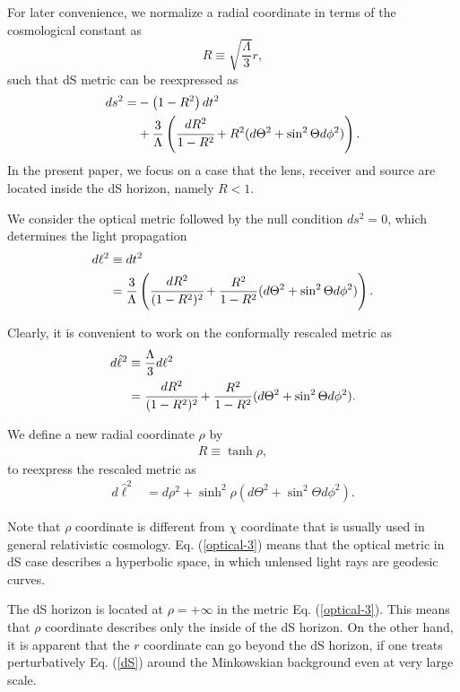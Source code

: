 \documentclass[twocolumn,showpacs,preprintnumbers,amsmath,amssymb]{revtex4-1}
\begin{document}
For later convenience, we normalize a radial coordinate 
in terms of the cosmological constant as 
\begin{equation}
R \equiv \sqrt{\frac{\Lambda}{3}} r , 
\label{R} 
\end{equation}
such that dS metric can be reexpressed as 
\begin{align}
  d s^2 =& -\left(1 - R^2\right) d t^2 
  \nonumber\\
  &+ 
 \frac{3}{\Lambda} 
 \left(
 \cfrac{d R^2}{1 - R^2}
+ R^2( d\Theta^2 + \sin^2 \Theta d\phi^2) 
\right) .
\label{dS-2}
\end{align}
In the present paper, 
we focus on a case that the lens, receiver and source are located 
inside the dS horizon, namely $R < 1$. 



We consider the optical metric followed by the null condition $ds^2 = 0$, 
which determines the light propagation 
\cite{AK2000, GW, Ishihara2016} 
\begin{align}
d\ell^2 &\equiv dt^2 
\nonumber\\
&= 
\frac{3}{\Lambda} 
 \left(
 \cfrac{d R^2}{(1 - R^2)^2}
+ \frac{R^2}{1 - R^2}( d\Theta^2 + \sin^2 \Theta d\phi^2) 
\right) . 
\label{optical}
\end{align}

Clearly, it is convenient to work on the conformally rescaled metric as 
\begin{align}
d\hat\ell^2 &\equiv \frac{\Lambda}{3} d\ell^2 
\nonumber\\
&= 
 \cfrac{d R^2}{(1 - R^2)^2}
+ \frac{R^2}{1 - R^2}( d\Theta^2 + \sin^2 \Theta d\phi^2) . 
\label{optical-2}
\end{align}

We define a new radial coordinate $\rho$ by 
\cite{footnote-1}
\begin{align}
R \equiv \tanh \rho , 
\label{rho}
\end{align}
to reexpress the rescaled metric as 
\begin{align}
d\hat\ell^2 
&= 
 d\rho^2
+ \sinh^2\rho( d\Theta^2 + \sin^2 \Theta d\phi^2) . 
\label{optical-3}
\end{align}

Note that $\rho$ coordinate is different from $\chi$ coordinate 
that is usually used in general relativistic cosmology. 
Eq. (\ref{optical-3}) means that the optical metric in dS case describes 
a hyperbolic space, in which unlensed light rays are geodesic curves. 

The dS horizon is located at $\rho = +\infty$ 
in the metric Eq. (\ref{optical-3}). 
This means that $\rho$ coordinate describes only the inside 
of the dS horizon. 
On the other hand, it is apparent that the $r$ coordinate 
can go beyond the dS horizon, if one treats perturbatively Eq. (\ref{dS}) 
around the Minkowskian background even at very large scale. 
\end{document}
